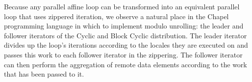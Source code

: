 Because any parallel affine loop can be transformed into an equivalent parallel loop that uses zippered iteration, we observe a natural place in the Chapel programming language in which to implement modulo unrolling: the leader and follower iterators of the Cyclic and Block Cyclic distribution. The leader iterator divides up the loop's iterations according to the locales they are executed on and passes this work to each follower iterator in the zippering. The follower iterator can then perform the aggregation of remote data elements according to the work that has been passed to it. 

